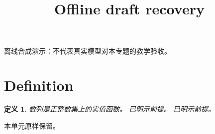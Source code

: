 \documentclass[UTF8,fontset=fandol,11pt]{ctexart}
\title{Offline draft recovery}
\date{}
\newtheorem{definition}{定义}[section]
\begin{document}
\maketitle
\par\noindent 离线合成演示：不代表真实模型对本专题的教学验收。\par
\section{Definition}\label{sec:S01}
\begin{definition}
数列是正整数集上的实值函数。 已明示前提。 已明示前提。
\end{definition}
本单元原样保留。\par
\end{document}
